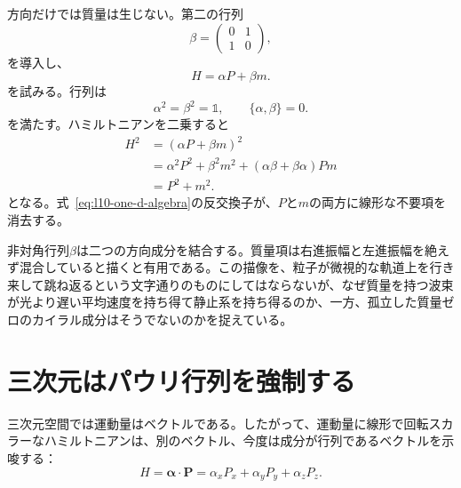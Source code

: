 方向だけでは質量は生じない。第二の行列
\begin{equation}
\beta=
\begin{pmatrix}
0&1\\
1&0
\end{pmatrix},
\end{equation}
を導入し、
\begin{equation}
H=\alpha P+\beta m.
\label{eq:l10-massive-one-d}
\end{equation}
を試みる。行列は
\begin{equation}
\alpha^2=\beta^2=\mathbb{1},
\qquad
\{\alpha,\beta\}=0.
\label{eq:l10-one-d-algebra}
\end{equation}
を満たす。ハミルトニアンを二乗すると
\begin{align}
H^2
&=(\alpha P+\beta m)^2\\
&=\alpha^2P^2+\beta^2m^2
  +(\alpha\beta+\beta\alpha)Pm\\
&=P^2+m^2.
\label{eq:l10-one-d-dispersion}
\end{align}
となる。式~\eqref{eq:l10-one-d-algebra}の反交換子が、\(P\)と\(m\)の両方に線形な不要項を消去する。

非対角行列\(\beta\)は二つの方向成分を結合する。質量項は右進振幅と左進振幅を絶えず混合していると描くと有用である。この描像を、粒子が微視的な軌道上を行き来して跳ね返るという文字通りのものにしてはならないが、なぜ質量を持つ波束が光より遅い平均速度を持ち得て静止系を持ち得るのか、一方、孤立した質量ゼロのカイラル成分はそうでないのかを捉えている。

\begin{classroomqa}
\end{classroomqa}

\section{三次元はパウリ行列を強制する}

三次元空間では運動量はベクトルである。したがって、運動量に線形で回転スカラーなハミルトニアンは、別のベクトル、今度は成分が行列であるベクトルを示唆する：
\begin{equation}
H=\boldsymbol{\alpha}\cdot\mathbf P
=\alpha_xP_x+\alpha_yP_y+\alpha_zP_z.
\label{eq:l10-three-d-ansatz}
\end{equation}

